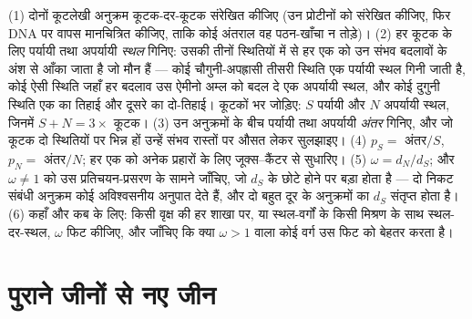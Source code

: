 \begin{method}[$d_{N}/d_{S}$ का आकलन]\label{met:b3:molecular-evolution:method}
(1) दोनों कूटलेखी अनुक्रम कूटक-दर-कूटक संरेखित कीजिए (उन प्रोटीनों को
संरेखित कीजिए, फिर DNA पर वापस मानचित्रित कीजिए, ताकि कोई अंतराल वह
पठन-खाँचा न तोड़े)। (2) हर कूटक के लिए पर्यायी तथा अपर्यायी \emph{स्थल}
गिनिए: उसकी तीनों स्थितियों में से हर एक को उन संभव बदलावों के अंश से
आँका जाता है जो मौन हैं --- कोई चौगुनी-अपह्रासी तीसरी स्थिति एक पर्यायी
स्थल गिनी जाती है, कोई ऐसी स्थिति जहाँ हर बदलाव उस ऐमीनो अम्ल को बदल दे
एक अपर्यायी स्थल, और कोई दुगुनी स्थिति एक का तिहाई और दूसरे का
दो-तिहाई। कूटकों भर जोड़िए: $S$ पर्यायी और $N$ अपर्यायी स्थल, जिनमें
$S + N = 3 \times$ कूटक। (3) उन अनुक्रमों के बीच पर्यायी तथा अपर्यायी
\emph{अंतर} गिनिए, और जो कूटक दो स्थितियों पर भिन्न हों उन्हें संभव
रास्तों पर औसत लेकर सुलझाइए। (4) $p_{S} = $ अंतर$/S$, $p_{N} = $ अंतर$/N$;
हर एक को अनेक प्रहारों के लिए जूक्स--कैंटर से सुधारिए। (5) $\omega =
d_{N}/d_{S}$; और $\omega \ne 1$ को उस प्रतिचयन-प्रसरण के सामने जाँचिए,
जो $d_{S}$ के छोटे होने पर बड़ा होता है --- दो निकट संबंधी अनुक्रम कोई
अविश्वसनीय अनुपात देते हैं, और दो बहुत दूर के अनुक्रमों का
$d_{S}$ संतृप्त होता है। (6) कहाँ और कब के लिए: किसी वृक्ष की हर शाखा
पर, या स्थल-वर्गों के किसी मिश्रण के साथ स्थल-दर-स्थल, $\omega$ फिट
कीजिए, और जाँचिए कि क्या $\omega > 1$ वाला कोई वर्ग उस फिट को बेहतर
करता है।
\end{method}

\section{पुराने जीनों से नए जीन}

